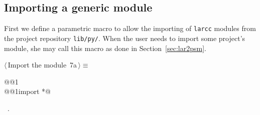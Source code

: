 \documentclass[11pt,oneside]{article}	%
\begin{document}
\subsection{Importing a generic module}
First we define a parametric macro to allow the importing of \texttt{larcc} modules from the project repository \texttt{lib/py/}. When the user needs to import some project's module, she may call this macro as done in Section~\ref{sec:lar2psm}.
\begin{flushleft} \small
\begin{minipage}{\linewidth} \label{scrap15}
\protect{}$\langle\,$Import the module\nobreak\ {\footnotesize 7a}$\,\rangle\equiv$
\vspace{-1ex}
\begin{list}{}{} \item
\mbox{}\verb@import @@1\verb@@\\
\mbox{}\verb@from @@1\verb@ import *@\\
\mbox{}\verb@@{\NWsep}
\end{list}
\vspace{-1ex}
\footnotesize\addtolength{\baselineskip}{-1ex}
\begin{list}{}{\setlength{\itemsep}{-\parsep}\setlength{\itemindent}{-\leftmargin}}
\item \NWtxtMacroRefIn\ .
\end{list}
\end{minipage}\\[4ex]
\end{flushleft}
\end{document}
